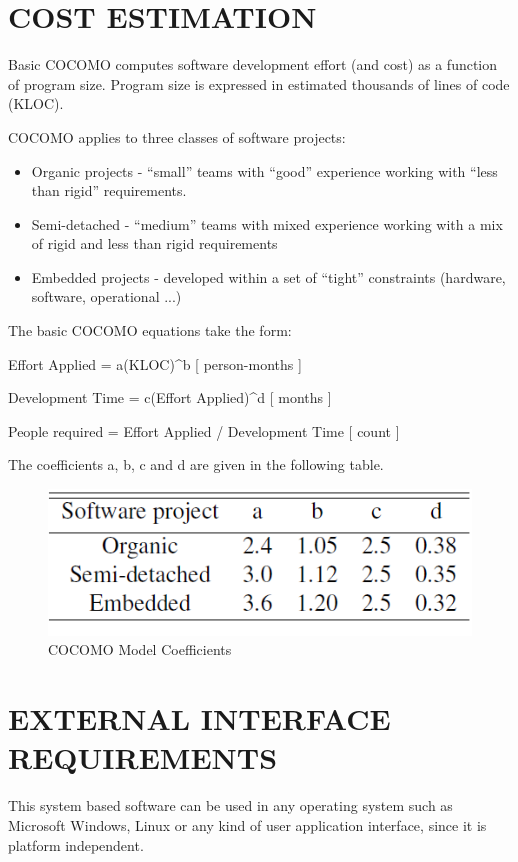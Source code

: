\documentclass[12pt,a4paper,oneside]{report}
\begin{document}
{\section{COST ESTIMATION}
\par Basic COCOMO computes software development effort (and cost) as a function of program
size. Program size is expressed in estimated thousands of lines of code (KLOC).
\par COCOMO applies to three classes of software projects:
\begin{itemize}
\item  Organic projects - “small” teams with “good” experience working with “less than rigid”
requirements.
\item Semi-detached - “medium” teams with mixed experience working with a mix of rigid
and less than rigid requirements
\item Embedded projects - developed within a set of “tight” constraints (hardware, software,
operational ...)
\end{itemize}
\par The basic COCOMO equations take the form:
\par Effort Applied = a(KLOC)\textasciicircum b [ person-months ]
\par Development Time = c(Effort Applied)\textasciicircum d [ months ]
\par People required = Effort Applied / Development Time [ count ]
\par The coefficients a, b, c and d are given in the following table.
\begin{figure}[h]
\begin{center}
\includegraphics[scale=.6]{cocomo.PNG}
\caption{COCOMO Model Coefficients}
\label{COCOMO Model Coefficients}
\end{center}
\end{figure}
\par
\section{EXTERNAL INTERFACE REQUIREMENTS}
This system based software can be used in any operating system such as Microsoft Windows, Linux or any kind of user application interface, since it is platform independent.

}
\end{document}
